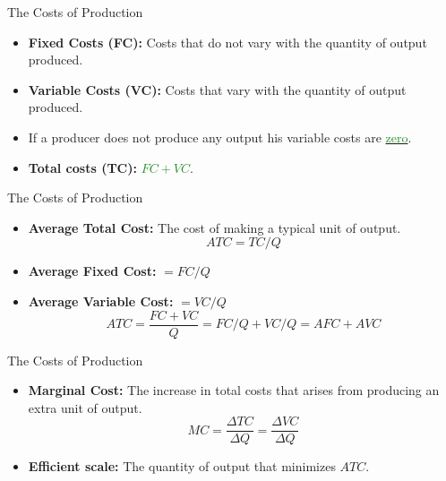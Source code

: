 \documentclass[xcolor={dvipsnames},pdf, hyperref={colorlinks=true, citecolor=ForestGreen, linkcolor=BlueViolet, urlcolor=Magenta}]{beamer}
\newcommand{\defn}[1]{\textbf{#1}}
\newcommand{\dd}[1]{{\underline{\textcolor{ForestGreen}{#1}}}}
\begin{document}
\begin{frame}{The Costs of Production}
\begin{itemize}
	\item \defn{Fixed Costs (FC):} Costs that do not vary with the quantity of output produced.
	\item \defn{Variable Costs (VC):} Costs that vary with the quantity of output produced.
	\item If a producer does not produce any output his variable costs are \dd{zero}.
	\item \defn{Total costs (TC):} \dd{$FC + VC$}.	
\end{itemize}
\end{frame}

\begin{frame}{The Costs of Production}
\begin{itemize}
	\item \defn{Average Total Cost:} The cost of making a typical unit of output. \[ATC = TC/Q\]
	\item \defn{Average Fixed Cost:} $=FC/Q$
	\item \defn{Average Variable Cost:} $=VC/Q$
	\[ATC =\frac{FC + VC}{Q} = FC/Q + VC/Q =  AFC + AVC\]
\end{itemize}
\end{frame}

\begin{frame}{The Costs of Production}
	\begin{itemize}
		\item \defn{Marginal Cost:} The increase in total costs that arises from producing an extra unit of output.
		\[MC = \frac{\Delta TC}{\Delta Q} = \frac{\Delta VC}{\Delta Q}\]
		\item \defn{Efficient scale:} The quantity of output that minimizes $ATC$.
	\end{itemize}
\end{frame}
\end{document}
